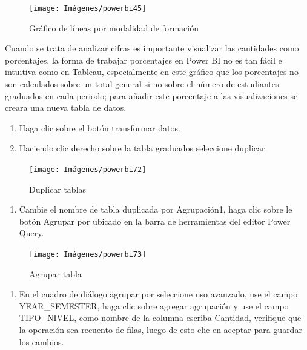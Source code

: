 \documentclass[
]{book}
\providecommand{\tightlist}{%
  \setlength{\itemsep}{0pt}\setlength{\parskip}{0pt}}
\begin{document}
\begin{figure}

{\centering \texttt{[image: Imágenes/powerbi45]} 

}

\caption{Gráfico de líneas por modalidad de formación}\label{fig:paso7lineassegmentadobi-fig}
\end{figure}

Cuando se trata de analizar cifras es importante visualizar las cantidades como porcentajes, la forma de trabajar porcentajes en Power BI no es tan fácil e intuitiva como en Tableau, especialmente en este gráfico que los porcentajes no son calculados sobre un total general si no sobre el número de estudiantes graduados en cada periodo; para añadir este porcentaje a las visualizaciones se creara una nueva tabla de datos.

\begin{enumerate}
\def\labelenumi{\arabic{enumi}.}
\item
  Haga clic sobre el botón transformar datos.
\item
  Haciendo clic derecho sobre la tabla graduados seleccione duplicar.
\end{enumerate}

\begin{figure}

{\centering \texttt{[image: Imágenes/powerbi72]} 

}

\caption{Duplicar tablas}\label{fig:paso2porcentajes-fig}
\end{figure}

\begin{enumerate}
\def\labelenumi{\arabic{enumi}.}
\setcounter{enumi}{2}
\tightlist
\item
  Cambie el nombre de tabla duplicada por Agrupación1, haga clic sobre le botón Agrupar por ubicado en la barra de herramientas del editor Power Query.
\end{enumerate}

\begin{figure}

{\centering \texttt{[image: Imágenes/powerbi73]} 

}

\caption{Agrupar tabla}\label{fig:paso3porcentajes-fig}
\end{figure}

\begin{enumerate}
\def\labelenumi{\arabic{enumi}.}
\setcounter{enumi}{3}
\tightlist
\item
  En el cuadro de diálogo agrupar por seleccione uso avanzado, use el campo YEAR\_SEMESTER, haga clic sobre agregar agrupación y use el campo TIPO\_NIVEL, como nombre de la columna escriba Cantidad, verifique que la operación sea recuento de filas, luego de esto clic en aceptar para guardar los cambios.
\end{enumerate}
\end{document}
